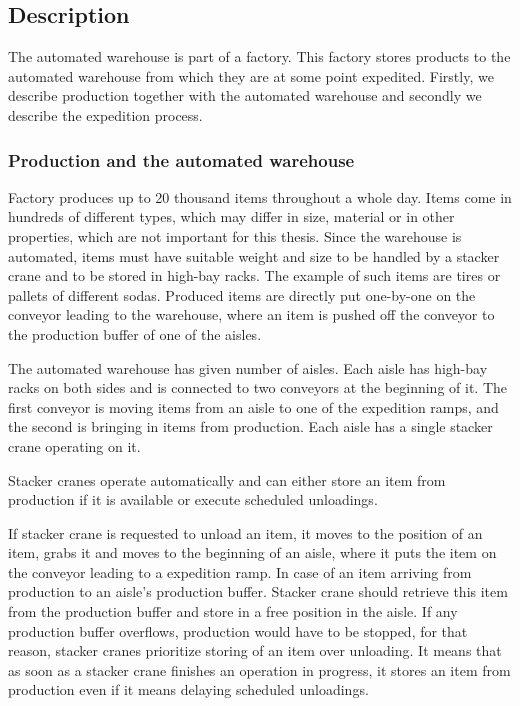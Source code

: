 \documentclass{ctuthesis}
\begin{document}
\subsection{Description}
\label{subsec:Description}
The automated warehouse is part of a factory. This factory stores products to the automated warehouse from which they are at some point expedited. Firstly, we describe production together with the automated warehouse and secondly we describe the expedition process.

\subsubsection{Production and the automated warehouse}

Factory produces up to 20 thousand items throughout a whole day. Items come in hundreds of different types, which may differ in size, material or in other properties, which are not important for this thesis. Since the warehouse is automated, items must have suitable weight and size to be handled by a stacker crane and to be stored in high-bay racks. The example of such items are tires or pallets of different sodas. Produced items are directly put one-by-one on the conveyor leading to the warehouse, where an item is pushed off the conveyor to the production buffer of one of the aisles.

The automated warehouse has given number of aisles. Each aisle has high-bay racks on both sides and is connected to two conveyors at the beginning of it. The first conveyor is moving items from an aisle to one of the expedition ramps, and the second is bringing in items from production. Each aisle has a single stacker crane operating on it.

Stacker cranes operate automatically and can either store an item from production if it is available or execute scheduled unloadings. 

If stacker crane is requested to unload an item, it moves to the position of an item, grabs it and moves to the beginning of an aisle, where it puts the item on the conveyor leading to a expedition ramp. In case of an item arriving from production to an aisle's production buffer. Stacker crane should retrieve this item from the production buffer and store in a free position in the aisle. If any production buffer overflows, production would have to be stopped, for that reason, stacker cranes prioritize storing of an item over unloading. It means that as soon as a stacker crane finishes an operation in progress, it stores an item from production even if it means delaying scheduled unloadings.
\end{document}
